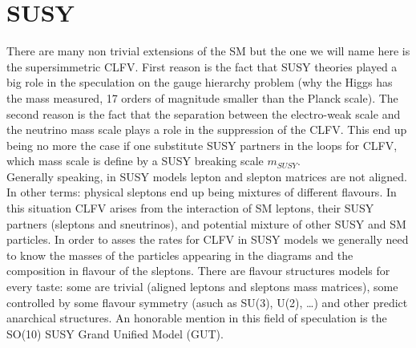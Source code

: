 \documentclass[12pt,a4paper,openright, oneside, titlepage]{book} %
\begin{document}
\section{SUSY}
There are many non trivial extensions of the SM but the one we will name here is the supersimmetric CLFV. First reason is the fact that SUSY theories played a big role in the speculation on the gauge hierarchy problem (why the Higgs has the mass measured, 17 orders of magnitude smaller than the Planck scale). The second reason is the fact that the separation between the electro-weak scale and the neutrino mass scale plays a role in the suppression of the CLFV. This end up being no more the case if one substitute SUSY partners in the loops for CLFV, which mass scale is define by a SUSY breaking scale $m_{SUSY}$.\\
Generally speaking, in SUSY models lepton and slepton matrices are not aligned. In other terms: physical sleptons end up being mixtures of different flavours. In this situation CLFV arises from the interaction of SM leptons, their SUSY partners (sleptons and sneutrinos), and potential mixture of other SUSY and SM particles. 
In order to asses the rates for CLFV in SUSY models we generally need to know the masses of the particles appearing in the diagrams and the composition in flavour of the sleptons.
There are flavour structures models for every taste: some are trivial (aligned leptons and sleptons mass matrices), some controlled by some flavour symmetry (asuch as SU(3), U(2), \ldots) and other predict anarchical structures. An honorable mention in this field of speculation is the SO(10) SUSY Grand Unified Model (GUT).
\end{document}
